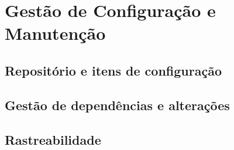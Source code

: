 \documentclass[a4paper,12pt,oneside,openany]{book}
\newif\iforientacoes
\newcommand{\orientacao}[1]{%
    \iforientacoes
        \begin{quote}
        \small\itshape\textbf{Orientação:} #1
        \end{quote}
    \fi
}
\begin{document}
\chapter{Gestão de Configuração e Manutenção}

\orientacao{Este capítulo deve mostrar como os artefatos do software são
versionados, modificados e mantidos de forma controlada. Relacionem as
práticas descritas ao projeto da equipe, evitando apenas reproduzir
definições teóricas.}

\section{Repositório e itens de configuração}

\orientacao{Informem o repositório utilizado e identifiquem os principais
itens de configuração que precisam ser controlados, por exemplo: código-fonte,
arquivos de configuração, scripts, documentação, modelos de dados e testes.
}
%
%

\section{Gestão de dependências e alterações}

\orientacao{Expliquem como dependências externas são registradas e versionadas
e como alterações relevantes são controladas. Quando uma alteração afetar
vários artefatos, indiquem como a equipe mantém a coerência entre código,
testes, documentação e demais elementos relacionados.}

\section{Rastreabilidade}

\orientacao{Quando aplicável, mostrem como uma alteração pode ser rastreada
entre os artefatos relacionados, por exemplo: necessidade/requisito, tarefa
ou \textit{issue}, componente afetado, \textit{commit} e caso de teste.
Não é necessário criar uma matriz extensa; um ou dois exemplos relevantes
podem ser suficientes para demonstrar a prática.}
\end{document}
